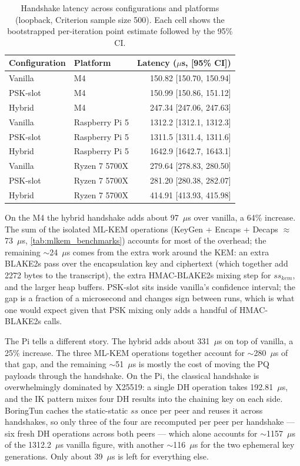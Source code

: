 \documentclass[11pt,a4paper]{article}
\begin{document}
\begin{table}[H]
\centering
\caption{Handshake latency across configurations and platforms (loopback, Criterion sample size 500). Each cell shows the bootstrapped per-iteration point estimate followed by the 95\% CI.}
\label{tab:handshake_latency}
\begin{tabular}{@{}llr@{}}
\toprule
\textbf{Configuration} & \textbf{Platform} & \textbf{Latency ($\mu$s, [95\% CI])} \\
\midrule
Vanilla   & M4              & 150.82 [150.70, 150.94] \\
PSK-slot  & M4              & 150.99 [150.86, 151.12] \\
Hybrid    & M4              & 247.34 [247.06, 247.63] \\
\midrule
Vanilla   & Raspberry Pi 5  & 1312.2 [1312.1, 1312.3] \\
PSK-slot  & Raspberry Pi 5  & 1311.5 [1311.4, 1311.6] \\
Hybrid    & Raspberry Pi 5  & 1642.9 [1642.7, 1643.1] \\
\midrule
Vanilla   & Ryzen 7 5700X   & 279.64 [278.83, 280.50] \\
PSK-slot  & Ryzen 7 5700X   & 281.20 [280.38, 282.07] \\
Hybrid    & Ryzen 7 5700X   & 414.91 [413.93, 415.98] \\
\bottomrule
\end{tabular}
\end{table}

On the M4 the hybrid handshake adds about 97~$\mu$s over vanilla, a 64\% increase. The sum of the isolated ML-KEM operations (KeyGen + Encaps + Decaps $\approx$ 73~$\mu$s, \cref{tab:mlkem_benchmarks}) accounts for most of the overhead; the remaining $\sim$24~$\mu$s comes from the extra work around the KEM: an extra BLAKE2s pass over the encapsulation key and ciphertext (which together add 2272 bytes to the transcript), the extra HMAC-BLAKE2s mixing step for $\mathit{ss}_\mathit{kem}$, and the larger heap buffers. PSK-slot sits inside vanilla's confidence interval; the gap is a fraction of a microsecond and changes sign between runs, which is what one would expect given that PSK mixing only adds a handful of HMAC-BLAKE2s calls.

The Pi tells a different story. The hybrid adds about 331~$\mu$s on top of vanilla, a 25\% increase. The three ML-KEM operations together account for $\sim$280~$\mu$s of that gap, and the remaining $\sim$51~$\mu$s is mostly the cost of moving the PQ payloads through the handshake. On the Pi, the classical handshake is overwhelmingly dominated by X25519: a single DH operation takes 192.81~$\mu$s, and the IK pattern mixes four DH results into the chaining key on each side. BoringTun caches the static-static $\mathit{ss}$ once per peer and reuses it across handshakes, so only three of the four are recomputed per peer per handshake --- six fresh DH operations across both peers --- which alone accounts for $\sim$1157~$\mu$s of the 1312.2~$\mu$s vanilla figure, with another $\sim$116~$\mu$s for the two ephemeral key generations. Only about 39~$\mu$s is left for everything else.
\end{document}
